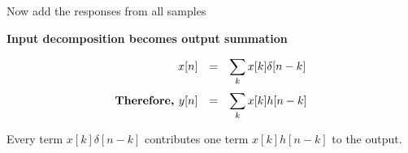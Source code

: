 \documentclass[aspectratio=169,11pt]{beamer}
\newcommand{\CardTitleSize}{\large}
\newcommand{\CardTitle}[1]{%
  \vspace{0.15cm}
  {\CardTitleSize\bfseries #1}\par
}
\begin{document}
\begin{frame}{Now add the responses from all samples}



\begin{center}
\begin{BlueCard}[
  width=\textwidth,
  halign=center,
  top=12pt,
  bottom=12pt
]
\CardTitle{Input decomposition becomes output summation}

\vspace{0.08cm}

{\Large
\[
\begin{array}{rcl}
x[n]
&=&
\displaystyle\sum_k x[k]\delta[n-k]
\\[16pt]
\text{\textbf{Therefore, }} y[n]
&=&
\displaystyle\sum_k x[k]h[n-k]
\end{array}
\]
}

\vspace{0.08cm}

\begin{GreenBox}[
  calloutshadedgreen,
  halign=center,
  fontupper=\large
]{}
Every term \(x[k]\delta[n-k]\) contributes one term \(x[k]h[n-k]\) to the output.
\end{GreenBox}

\end{BlueCard}
\end{center}

\end{frame}
\end{document}
